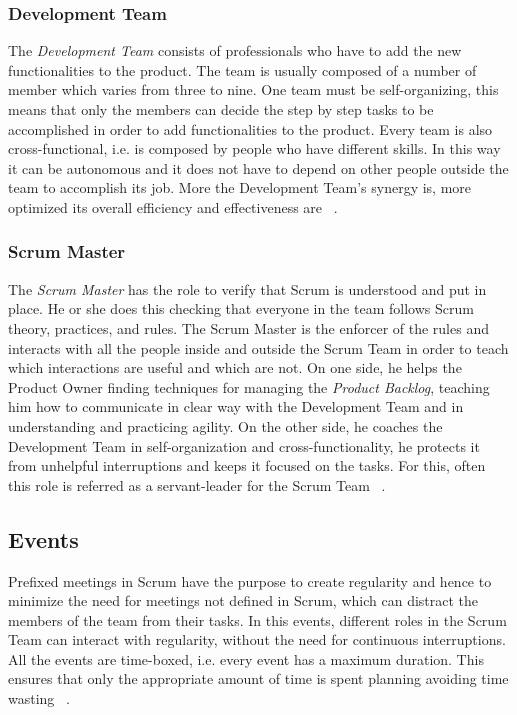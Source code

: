 			\subsubsection{Development Team}\label{ref_scrum_dev_team}
			The \emph{Development Team} consists of professionals who have to add the new functionalities to the product. The team is usually composed of a number of member which varies from three to nine. 	
			One team must be self-organizing, this means that only the members can decide the step by step tasks to be accomplished in order to add functionalities to the product. Every team is also cross-functional, i.e. is composed by people who have different skills. In this way it can be autonomous and it does not have to depend on other people outside the team to accomplish its job.
			More the Development Team's synergy is, more optimized its overall efficiency and effectiveness are ~\cite{scrumEnglishGuide}.
 
			\subsubsection{Scrum Master}\label{ref_scrum_master}
			The \emph{Scrum Master} has the role to verify that Scrum is understood and put in place. He or she does this checking that everyone in the team follows Scrum theory, practices, and rules. 
			The Scrum Master is the enforcer of the rules and interacts with all the people inside and outside the Scrum Team in order to teach which interactions are useful and which are not.
			On one side, he helps the Product Owner finding techniques for managing the \emph{Product Backlog}, teaching him how to communicate in clear way with the Development Team and in understanding and practicing agility. On the other side, he coaches the Development Team in self-organization and cross-functionality, he protects it from unhelpful interruptions and keeps it focused on the tasks. 
			For this, often this role is referred as a servant-leader for the Scrum Team ~\cite{scrumEnglishGuide}.


		\subsection{Events}\label{ref_scrum_events}
			Prefixed meetings in Scrum have the purpose to create regularity and hence to minimize the need for meetings not defined in Scrum, which can distract the members of the team from their tasks. In this events, different roles in the Scrum Team can interact with regularity, without the need for continuous interruptions. All the events are time-boxed, i.e. every event has a maximum duration. This ensures that only the appropriate amount of time is spent planning avoiding time wasting ~\cite{scrumEnglishGuide}. 

